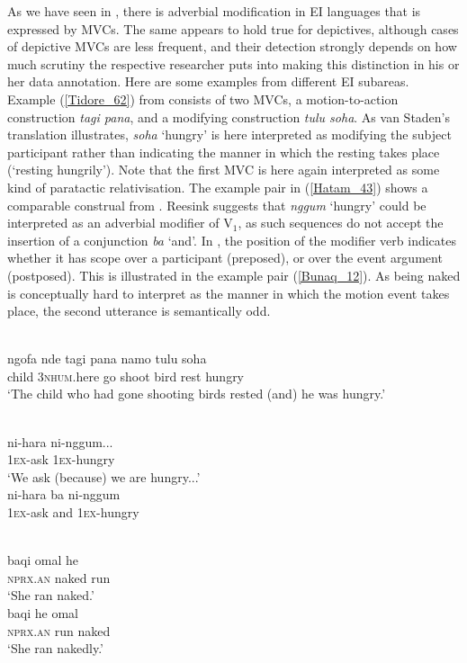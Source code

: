 As we have seen in , there is adverbial modification in EI languages that is expressed by MVCs. The same appears to hold true for depictives, although cases of depictive MVCs are less frequent, and their detection strongly depends on how much scrutiny the respective researcher puts into making this distinction in his or her data annotation. Here are some examples from different EI subareas. Example (\ref{Tidore_62}) from  consists of two MVCs, a motion-to-action construction \textit{tagi pana}, and a modifying construction \textit{tulu soha}. As van Staden's translation illustrates, \textit{soha} `hungry' is here interpreted as modifying the subject participant rather than indicating the manner in which the resting takes place (`resting hungrily'). Note that the first MVC is here again interpreted as some kind of paratactic relativisation. The example pair in (\ref{Hatam_43}) shows a comparable construal from . Reesink suggests that \textit{nggum} `hungry' could be interpreted as an adverbial modifier of V$_1$, as such sequences do not accept the insertion of a conjunction \textit{ba} `and'. In , the position of the modifier verb indicates whether it has scope over a participant (preposed), or over the event argument (postposed). This is illustrated in the example pair (\ref{Bunaq_12}). As being naked is conceptually hard to interpret as the manner in which the motion event takes place, the second utterance is semantically odd.

\ea \label{Tidore_62}
\\
\gll ngofa nde tagi pana namo tulu soha \\
child 3\textsc{nhum}.here go shoot bird rest hungry \\
\glft `The child who had gone shooting birds rested (and) he was hungry.'\\ 
\z

\ea \label{Hatam_43}
\\
\ea
\gll ni-hara ni-nggum... \\
1\textsc{ex}-ask 1\textsc{ex}-hungry \\
\glft `We ask (because) we are hungry...' \\ 
\ex
\gll *ni-hara ba ni-nggum \\ 
1\textsc{ex}-ask and 1\textsc{ex}-hungry \\
\z
\z

\ea \label{Bunaq_12}
\\
\ea
\gll baqi omal he \\
\textsc{nprx}.\textsc{an} naked run \\
\glft `She ran naked.' \\ 
\ex
\gll baqi he omal \\ 
\textsc{nprx}.\textsc{an} run naked \\
\glft `She ran nakedly.' \\ 
\z
\z

